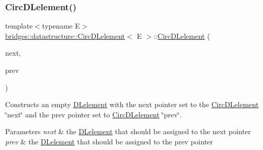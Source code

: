 \subsubsection{\texorpdfstring{Circ\+D\+Lelement()}{CircDLelement()}\hspace{0.1cm}{\footnotesize\ttfamily [3/4]}}
{\footnotesize\ttfamily template$<$typename E$>$ \\
\mbox{\hyperlink{classbridges_1_1datastructure_1_1_circ_d_lelement}{bridges\+::datastructure\+::\+Circ\+D\+Lelement}}$<$ E $>$\+::\mbox{\hyperlink{classbridges_1_1datastructure_1_1_circ_d_lelement}{Circ\+D\+Lelement}} (\begin{DoxyParamCaption}\item[{\mbox{\hyperlink{classbridges_1_1datastructure_1_1_circ_d_lelement}{Circ\+D\+Lelement}}$<$ E $>$}]{next,  }\item[{\mbox{\hyperlink{classbridges_1_1datastructure_1_1_circ_d_lelement}{Circ\+D\+Lelement}}$<$ E $>$}]{prev }\end{DoxyParamCaption})\hspace{0.3cm}{\ttfamily [inline]}}

Constructs an empty \mbox{\hyperlink{classbridges_1_1datastructure_1_1_d_lelement}{D\+Lelement}} with the next pointer set to the \mbox{\hyperlink{classbridges_1_1datastructure_1_1_circ_d_lelement}{Circ\+D\+Lelement}} \char`\"{}next\char`\"{} and the prev pointer set to \mbox{\hyperlink{classbridges_1_1datastructure_1_1_circ_d_lelement}{Circ\+D\+Lelement}} \char`\"{}prev\char`\"{}.


\begin{DoxyParams}{Parameters}
{\em next} & the \mbox{\hyperlink{classbridges_1_1datastructure_1_1_d_lelement}{D\+Lelement}} that should be assigned to the next pointer \\
\hline
{\em prev} & the \mbox{\hyperlink{classbridges_1_1datastructure_1_1_d_lelement}{D\+Lelement}} that should be assigned to the prev pointer \\
\hline
\end{DoxyParams}
\mbox{\label{classbridges_1_1datastructure_1_1_circ_d_lelement_a52b304df48ac1ba5a13b4c3c596f433b}} 
